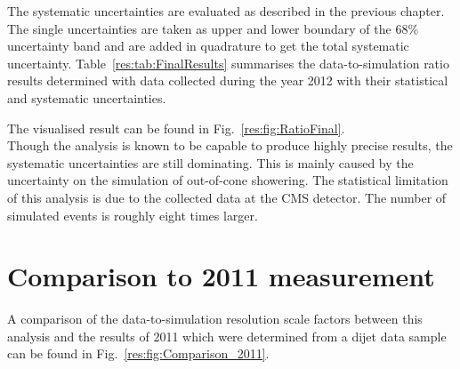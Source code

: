 The systematic uncertainties are evaluated as described in the previous chapter. 
The single uncertainties are taken as upper and lower boundary of the 68\% uncertainty band and are added in quadrature to get the total systematic uncertainty.
Table~\ref{res:tab:FinalResults} summarises the data-to-simulation ratio results determined with data collected during the year 2012 with their statistical and systematic uncertainties.
\renewcommand{\arraystretch}{1.5}
\begin{table}[t]
\centering
\caption{Data-to-simulation resolution scale factors \rhores with statistical and systematic uncertainties.}
\label{res:tab:FinalResults}
\large{
}
\end{table}  
The visualised result can be found in Fig.~\ref{res:fig:RatioFinal}.\\




Though the \GAMJET analysis is known to be capable to produce highly precise results, the systematic uncertainties are still dominating. 
This is mainly caused by the uncertainty on the simulation of out-of-cone showering.
The statistical limitation of this analysis is due to the collected data at the CMS detector.
The number of simulated events is roughly eight times larger.

 
\section{Comparison to 2011 measurement}
\label{res:sec:comparison_2010}
A comparison of the data-to-simulation resolution scale factors \rhores between this analysis and the results of 2011 which were determined from a dijet data sample~\cite{bib:Matthias_Thesis} can be found in Fig.~\ref{res:fig:Comparison_2011}.

